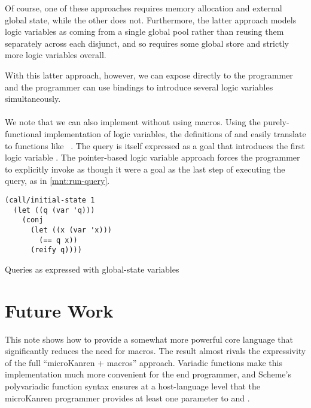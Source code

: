 \documentclass[sigplan,draft,balance,pbalance,natbib=false]{acmart}
\begin{document}
Of course, one of these approaches requires memory allocation and
external global state, while the other does not. Furthermore, the
latter approach models logic variables as coming from a single global
pool rather than reusing them separately across each disjunct, and so
requires some global store and strictly more logic variables overall.

With this latter approach, however, we can expose 
directly to the programmer and the programmer can use 
bindings to introduce several logic variables simultaneously.

\paragraph{}

We note that we can also implement  without using
macros. Using the purely-functional implementation of logic variables,
the definitions of  and  easily
translate to functions
like ~\cite{hemann2013muKanren}. The
query is itself expressed as a goal that introduces the first logic
variable . The pointer-based logic variable approach
forces the programmer to explicitly invoke  as
though it were a goal as the last step of executing the query, as in
\cref{mnt:run-query}.

\begin{listing}
  \begin{verbatim}
(call/initial-state 1
  (let ((q (var 'q)))
    (conj
      (let ((x (var 'x)))
        (== q x))
      (reify q))))
  \end{verbatim}
  \caption{Queries as expressed with global-state variables}
  \label{mnt:run-query}
\end{listing}

\section{Future Work}\label{sec:conclusion}

This note shows how to provide a somewhat more powerful core language
that significantly reduces the need for macros. The result almost
rivals the expressivity of the full \enquote{microKanren + macros}
approach. Variadic functions make this implementation much more
convenient for the end programmer, and Scheme's polyvariadic function
syntax ensures at a host-language level that the microKanren
programmer provides at least one parameter to 
and .
\end{document}
